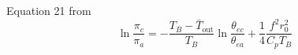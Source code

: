 \begin{table}[ht]
\caption{Symbols (sym), names and \texttt{code-names} (\texttt{cn})
taken from NEMO outputs in this report.}
\label{tab:pi-symb}
\end{table}

Equation 21 from \cite{emanuel1986air}
\begin{equation}
\ln \frac{\pi_{c}}{\pi_{a}}=-\frac{T_{B}-\bar{T}_{\mathrm{out}}}{T_{B}}
 \ln \frac{\theta_{e c}}{\theta_{e a}}+\frac{1}{4} \frac{f^{2} r_{0}^{2}}{C_{p} T_{B}}
\end{equation}
